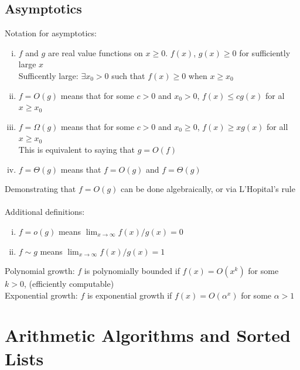 \documentclass{article}
\begin{document}
		\subsection{Asymptotics}
			Notation for asymptotics:
			\begin{enumerate}[(i)]
				\item $f$ and $g$ are real value functions on $x \geq 0$. $f(x)$, $g(x) \geq 0$ for sufficiently large $x$ \\
				Sufficently large: $\exists x_0 > 0$ such that $f(x) \geq 0$ when $x \geq x_0$
				\item $f = O(g)$ means that for some $c > 0$ and $x_0 > 0$, $f(x) \leq cg(x)$ for al $x \geq x_0$
				\item $f = \Omega(g)$ means that for some $c > 0$ and $x_0 \geq 0$, $f(x) \geq xg(x)$ for all $x \geq x_0$ \\
				This is equivalent to saying that $g = O(f)$
				\item $f = \Theta(g)$ means that $f = O(g)$ and $f = \Theta(g)$
				\end{enumerate}
			Demonstrating that $f = O(g)$ can be done algebraically, or via L'Hopital's rule \\
			\\
			Additional definitions:
			\begin{enumerate}[(i)]
				\item $f = o(g)$ means $\lim_{x \to \infty} f(x)/g(x) = 0$
				\item $f \sim g$ means $\lim_{x \to \infty} f(x)/g(x) = 1$
				\end{enumerate}
			Polynomial growth: $f$ is polynomially bounded if $f(x) = O(x^k)$ for some $k > 0$, (efficiently computable) \\
			Exponential growth: $f$ is exponential growth if $f(x) = O(\alpha^x)$ for some $\alpha > 1$
		\clearpage

	\section{Arithmetic Algorithms and Sorted Lists}
\end{document}
